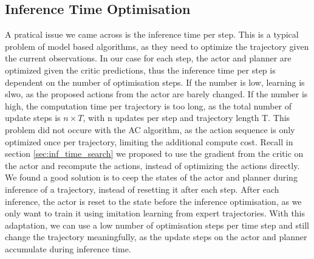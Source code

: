 \subsection{Inference Time Optimisation}
A pratical issue we came across is the inference time per step. This is a typical problem of model based algorithms, as they need to optimize the trajectory given 
the current observations. In our case for each step, the actor and planner are optimized given the critic predictions, thus the inference time 
per step is dependent on the number of optimisation steps. If the number is low, learning is slwo, as the proposed actions from the actor are barely changed. 
If the number is high, the computation time per trajectory is too long, as the total number of update steps is $n \times T$, with n updates per step and trajectory length 
T. This problem did not occure with the AC algorithm, as the action sequence is only optimized 
once per trajectory, limiting the additional compute cost. Recall in section \ref{sec:inf_time_search} we proposed to use the gradient from the critic on the actor and recompute the 
actions, instead of optimizing the actions directly. We found a good solution is to ceep the states of the actor and planner during inference of a trajectory, 
instead of resetting it after each step. After each inference, the actor is reset to the state before the inference optimisation, as we only want to 
train it using imitation learning from expert trajectories. With this adaptation, we can use a low number of optimisation steps per time step and still change the trajectory meaningfully, 
as the update steps on the actor and planner accumulate during inference time.
     
